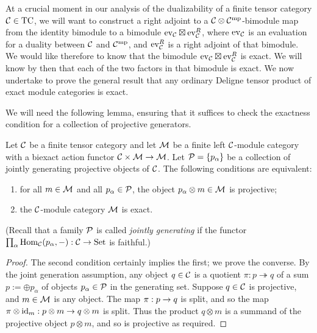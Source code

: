 \documentclass{amsart}
\begin{document}
At a crucial moment in our analysis of the dualizability of a finite tensor category $\mathcal C \in \mathrm{TC}$, we will want to construct a right adjoint to a $\mathcal C \otimes \mathcal C^{\mathrm{mp}}$-bimodule map from the identity bimodule to a bimodule $\mathrm{ev}_\mathcal C \boxtimes \mathrm{ev}_\mathcal C^R$, where $\mathrm{ev}_\mathcal C$ is an evaluation for a duality between $\mathcal C$ and $\mathcal C^{\mathrm{mp}}$, and $\mathrm{ev}_\mathcal C^R$ is a right adjoint of that bimodule.  We would like therefore to know that the bimodule $\mathrm{ev}_\mathcal C \boxtimes \mathrm{ev}_\mathcal C^R$ is exact.  We will know by then that each of the two factors in that bimodule is exact.  We now undertake to prove the general result that any ordinary Deligne tensor product of exact module categories is exact.

We will need the following lemma, ensuring that it suffices to check the exactness condition for a collection of projective generators.

\begin{lemma} \label{lma:Exact_checked_on_proj_gens}
	Let $\mathcal C$ be a finite tensor category and let $\mathcal M$ be a finite left $\mathcal C$-module category with a biexact action functor $\mathcal C \times \mathcal M \rightarrow \mathcal M$. Let $\mathcal P = \{ p_\alpha \}$ be a collection of jointly generating projective objects of  $\mathcal C$. The following conditions are equivalent:
	\begin{enumerate}
		\item for all $m \in \mathcal M$ and all $p_\alpha \in \mathcal P$, the object $p_\alpha \otimes m \in \mathcal M$ is projective;
		\item the $\mathcal C$-module category $\mathcal M$ is exact.
	\end{enumerate}
\end{lemma}

\noindent (Recall that a family $\mathcal P$ is called {\em jointly generating} if the functor $\prod_\alpha \operatorname{Hom}_\mathcal C(p_\alpha, -): \mathcal C \to \mathrm{Set}$ is faithful.) %

\begin{proof}
The second condition certainly implies the first; we prove the converse.  By the joint generation assumption, any object $q \in \mathcal C$ is a quotient $\pi: p \twoheadrightarrow q$ of a sum $p := \oplus p_\alpha$ of objects $p_\alpha \in \mathcal P$ in the generating set.  Suppose $q \in \mathcal C$ is projective, and $m \in \mathcal M$ is any object.  The map $\pi: p \rightarrow q$ is split, and so the map $\pi \otimes \mathrm{id}_m: p \otimes m \rightarrow q \otimes m$ is split.  Thus the product $q \otimes m$ is a summand of the projective object $p \otimes m$, and so is projective as required.
\end{proof}
\end{document}
